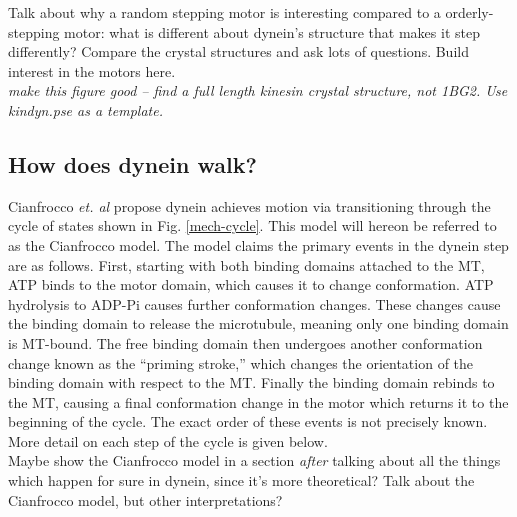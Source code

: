\documentclass[10pt]{article} %
\begin{document}
Talk about why a random stepping motor is interesting compared to a orderly-stepping motor: what
is different about dynein's structure that makes it step differently? Compare the crystal structures
and ask lots of questions. Build interest in the motors here.\\


\textit{make this figure good -- find a full length kinesin crystal structure, not 1BG2. Use kindyn.pse as a template.}

\subsection{How does dynein walk?}

Cianfrocco \textit{et. al} \cite{cianfroccoreview} propose dynein achieves motion via transitioning through the cycle of states shown in Fig. \ref{mech-cycle}. This model will hereon be referred to as the Cianfrocco model. The model claims the primary events in the dynein step are as follows. First, starting with both binding domains attached to the MT, ATP binds to the motor domain, which causes it to change conformation. ATP hydrolysis to ADP-Pi causes further conformation changes. These changes cause the binding domain to release the microtubule, meaning only one binding domain is MT-bound. The free binding domain then undergoes another conformation change known as the ``priming stroke,'' which changes the orientation of the binding domain with respect to the MT. Finally the binding domain rebinds to the MT, causing a final conformation change in the motor which returns it to the beginning of the cycle. The exact order of these events is not precisely known. More detail on each step of the cycle is given below.\\

Maybe show the Cianfrocco model in a section \textit{after} talking about all the things which happen for sure in dynein, since it's more theoretical? Talk about the Cianfrocco model, but other interpretations?
\end{document}
